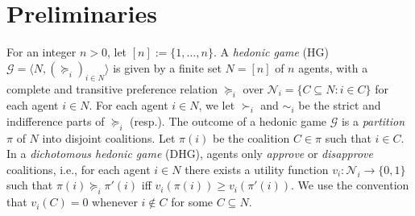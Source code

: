 \documentclass[letterpaper]{article}
\begin{document}
\section{Preliminaries}
\label{sec:Preliminaries}
For an integer $n > 0$, let $[n] := \{1,\dots,n\}$.
A \textit{hedonic game} (HG) $\mathcal{G} = \langle N, (\succeq_i)_{i \in N} \rangle$ is given by a finite set $N = [n]$ of $n$ agents, with a complete and transitive preference relation $\succeq_i$ over $\mathcal{N}_i = \{C \subseteq N : i \in C\}$ for each agent $i \in N$. For each agent $i \in N$, we let $\succ_i$ and $\sim_i$ be the strict and indifference parts of $\succeq_i$ (resp.). The outcome of a hedonic game $\mathcal{G}$ is a \textit{partition} $\pi$ of $N$ into disjoint coalitions. Let $\pi(i)$ be the coalition $C \in \pi$ such that $i \in C$. In a \textit{dichotomous hedonic game} (DHG), agents only \textit{approve} or \textit{disapprove} coalitions, i.e., for each agent $i \in N$ there exists a utility function $v_i: \mathcal{N}_i \rightarrow \{0,1\}$ such that $\pi(i) \succeq_i \pi'(i)$ iff $v_i(\pi(i)) \geq v_i(\pi'(i))$. We use the convention that $v_i(C) = 0$ whenever $i \notin C$ for some $C \subseteq N$.
\end{document}
